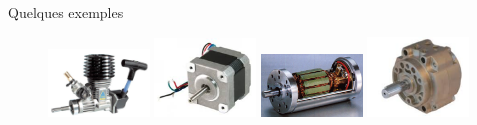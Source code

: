\documentclass{beamer}
\begin{document}
    \begin{frame}{Quelques exemples}
      \centering
      \begin{figure}[h]
        \centering
          \includegraphics[width=0.24\textwidth]{images/moteur_thermique}
          \includegraphics[width=0.24\textwidth]{images/moteur_paspas}
          \includegraphics[width=0.24\textwidth]{images/moteur_continu}
          \includegraphics[width=0.24\textwidth]{images/verin_rotatif}\\


\end{figure}
\end{frame}
\end{document}
